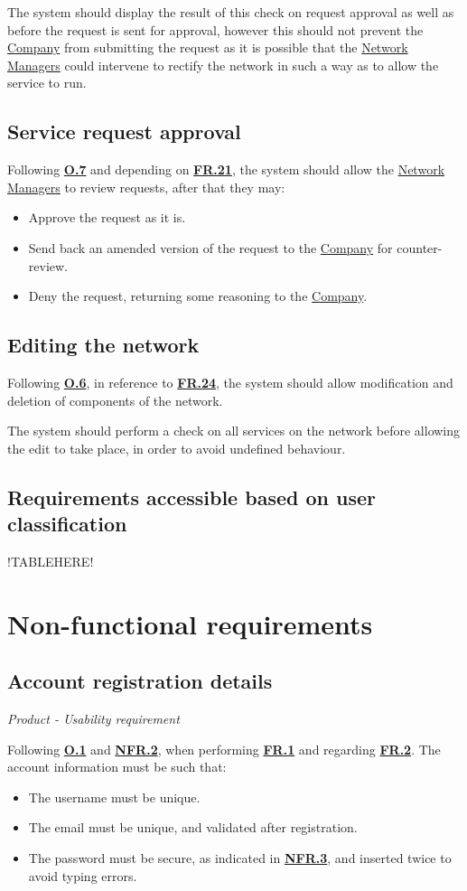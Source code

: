 \documentclass[12pt]{article}
\renewcommand\bf[1]{\textbf{#1}}
\renewcommand\it[1]{\textit{#1}}
\newcommand\un[1]{\underline{#1}}
\newcommand\hyl[1]{\hyperref[#1]{\bf{#1}}}
\begin{document}
The system should display the result of this check on request approval as well as before the request is sent for approval, however this 
should not prevent the \un{Company} from submitting the request as it is possible that the \un{Network Managers} could intervene to rectify the network in such a way as to allow the service to run.

\subsection{Service request approval} \label{FR.30}
Following \hyl{O.7} and depending on \hyl{FR.21}, the system should allow the \un{Network Managers} to review requests, after that they may:

\begin{itemize}
	\item Approve the request as it is.
	\item Send back an amended version of the request to the \un{Company} for counter-review.
	\item Deny the request, returning some reasoning to the \un{Company}.
\end{itemize}

\subsection{Editing the network} \label{FR.31}
Following \hyl{O.6}, in reference to \hyl{FR.24}, the system should allow modification and deletion 
of components of the network.

The system should perform a check on all services on the network before allowing the edit to take place, in order to avoid undefined behaviour.

\subsection{Requirements accessible based on user classification} \label{FR.32}
!TABLEHERE!

\section{Non-functional requirements}
\subsection{Account registration details} \label{NFR.1}
\it{Product - Usability requirement}

Following \hyl{O.1} and \hyl{NFR.2}, when performing \hyl{FR.1} and regarding \hyl{FR.2}.
The account information must be such that:
\begin{itemize}
	\item The username must be unique.
	\item The email must be unique, and validated after registration.
	\item The password must be secure, as indicated in \hyl{NFR.3}, and inserted twice to avoid typing errors.
\end{itemize}
\end{document}
